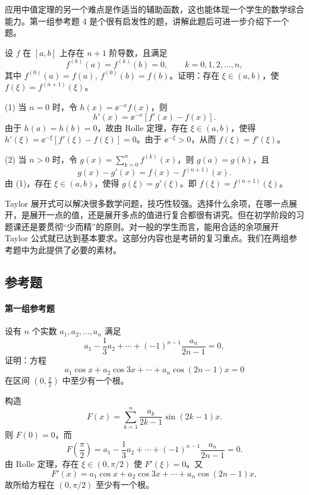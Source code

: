 应用中值定理的另一个难点是作适当的辅助函数，这也能体现一个学生的数学综合能力。第一组参考题 4 是个很有启发性的题，讲解此题后可进一步介绍下一个题。

\begin{xexample}[7.3.1]
设 $f$ 在 $[a,b]$ 上存在 $n+1$ 阶导数，且满足
\[
  f^{(k)}(a)=f^{(k)}(b)=0,\qquad k=0,1,2,\ldots,n,
\]
其中 $f^{(0)}(a)=f(a),\ f^{(0)}(b)=f(b)$。证明：存在 $\xi\in(a,b)$，使 $f(\xi)=f^{(n+1)}(\xi)$。
\end{xexample}
\begin{xproof}
(1) 当 $n=0$ 时，令 $h(x)=\ee^{-x}f(x)$，则
\[
  h'(x)=\ee^{-x}[f'(x)-f(x)].
\]
由于 $h(a)=h(b)=0$，故由 Rolle 定理，存在 $\xi\in(a,b)$，使得 $h'(\xi)=\ee^{-\xi}[f'(\xi)-f(\xi)]=0$。由于 $\ee^{-\xi}>0$，从而 $f(\xi)=f'(\xi)$。

(2) 当 $n>0$ 时，令 $g(x)=\sum_{k=0}^n f^{(k)}(x)$，则 $g(a)=g(b)$，且
\[
  g(x)-g'(x)=f(x)-f^{(n+1)}(x).
\]
由 (1)，存在 $\xi\in(a,b)$，使得 $g(\xi)=g'(\xi)$。即 $f(\xi)=f^{(n+1)}(\xi)$。
\end{xproof}

Taylor 展开式可以解决很多数学问题，技巧性较强。选择什么余项，在哪一点展开，是展开一点的值，还是展开多点的值进行复合都很有讲究。但在初学阶段的习题课还是要贯彻“少而精”的原则。对一般的学生而言，能用合适的余项展开 Taylor 公式就已达到基本要求。这部分内容也是考研的复习重点。我们在两组参考题中为此提供了必要的素材。

\subsection{参考题}

\paragraph{第一组参考题}

\begin{xreferenceproblem}[1]
设有 $n$ 个实数 $a_1,a_2,\ldots,a_n$ 满足
\[
  a_1-\frac13a_2+\cdots+(-1)^{n-1}\frac{a_n}{2n-1}=0,
\]
证明：方程
\[
  a_1\cos x+a_2\cos3x+\cdots+a_n\cos(2n-1)x=0
\]
在区间 $\left(0,\frac{\pi}{2}\right)$ 中至少有一个根。
\end{xreferenceproblem}
\begin{xsolution}
构造
\[
  F(x)=\sum_{k=1}^n\frac{a_k}{2k-1}\sin(2k-1)x.
\]
则 $F(0)=0$，而
\[
  F\left(\frac\pi2\right)
  =a_1-\frac13a_2+\cdots+(-1)^{n-1}\frac{a_n}{2n-1}=0.
\]
由 Rolle 定理，存在 $\xi\in(0,\pi/2)$ 使 $F'(\xi)=0$。又
\[
  F'(x)=a_1\cos x+a_2\cos3x+\cdots+a_n\cos(2n-1)x,
\]
故所给方程在 $(0,\pi/2)$ 至少有一个根。
\end{xsolution}



